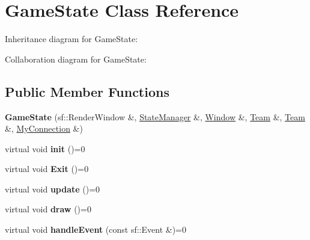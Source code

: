 \hypertarget{class_game_state}{\section{Game\+State Class Reference}
\label{class_game_state}
}


Inheritance diagram for Game\+State\+:


Collaboration diagram for Game\+State\+:
\subsection*{Public Member Functions}
\begin{DoxyCompactItemize}
\item 
\hypertarget{class_game_state_a366311c146b1473214533bc0664c5ef4}{{\bfseries Game\+State} (sf\+::\+Render\+Window \&, \hyperlink{class_state_manager}{State\+Manager} \&, \hyperlink{class_window}{Window} \&, \hyperlink{class_team}{Team} \&, \hyperlink{class_team}{Team} \&, \hyperlink{class_my_connection}{My\+Connection} \&)}\label{class_game_state_a366311c146b1473214533bc0664c5ef4}

\item 
\hypertarget{class_game_state_a6187cf801b77fa905cbe6ad385b4171c}{virtual void {\bfseries init} ()=0}\label{class_game_state_a6187cf801b77fa905cbe6ad385b4171c}

\item 
\hypertarget{class_game_state_a132e4c79e7562c005dec680c2290636f}{virtual void {\bfseries Exit} ()=0}\label{class_game_state_a132e4c79e7562c005dec680c2290636f}

\item 
\hypertarget{class_game_state_ab2864bfa04f92f6966861a1f2883bda0}{virtual void {\bfseries update} ()=0}\label{class_game_state_ab2864bfa04f92f6966861a1f2883bda0}

\item 
\hypertarget{class_game_state_ac872d748df12ac36d7a42a191997e4f7}{virtual void {\bfseries draw} ()=0}\label{class_game_state_ac872d748df12ac36d7a42a191997e4f7}

\item 
\hypertarget{class_game_state_aa0c449eefba402b50951cd23462e9502}{virtual void {\bfseries handle\+Event} (const sf\+::\+Event \&)=0}\label{class_game_state_aa0c449eefba402b50951cd23462e9502}

\end{DoxyCompactItemize}
